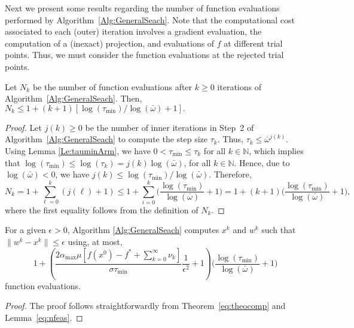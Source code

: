 Next we present some results regarding the  number of function evaluations performed by Algorithm~\ref{Alg:GeneralSeach}.
Note that the computational cost associated to each (outer) iteration involves a gradient evaluation, the computation of a (inexact) projection, and evaluations of $f$ at different trial points.
Thus, we must consider the function evaluations at the rejected trial points.
\begin{lemma} \label{eq:nfeas}
	Let $N_{k}$ be  the number of function evaluations after $k\geq 0$ iterations of Algorithm~\textup{\ref{Alg:GeneralSeach}}. Then,  $N_{k}\leq 1+ (k+1)[\log (\tau_{\min})/\log (\bar\omega)+1].$
\end{lemma}
\begin{proof}
	Let $j(k)\geq 0$ be the number of inner iterations in Step~2 of Algorithm~\ref{Alg:GeneralSeach} to compute the step size $\tau_k$.  Thus, $\tau_k\leq {\bar\omega}^{j(k)}$.
	Using Lemma \ref {Le:tauminArm}, we have  $0< \tau_{\min}\leq  \tau _{k}$ for all  $k\in \mathbb{N}$, which implies that  $ \log \left( \tau_{\min} \right) \leq \log (\tau _{k})=j(k) \log (\bar\omega)$, for all $k \in \mathbb{N}$.  Hence, due to  $\log(\bar\omega) <0$, we have $ j(k) \leq \log (\tau_{\min})/\log (\bar\omega)$. Therefore,
	$$
		N_k =	1+ \sum _{\ell=0}^{k}(j(\ell)+1)\leq 1+  \sum _{i=0}^{k} \Big(\frac{\log (\tau_{\min})}{\log (\bar\omega)} +1\Big)= 1+(k+1) \Big(\frac{\log (\tau_{\min})}{\log (\bar\omega)}+1\Big),
	$$
	where the first equality follows from the definition of $N_k$.
\end{proof}
\begin{theorem}
	For a given $\epsilon>0$, Algorithm \ref{Alg:GeneralSeach} computes $x^k$ and $w^k$ such that $\|  w^{k}-x^{k}\|\leq \epsilon$ using,  at most,
	$$1+\left({\frac{2{\alpha_{\max}}\mu\left[f(x^0)-f^* +\sum_{k= 0}^{\infty}\nu_k\right] }{\sigma \tau_{\min}}} \frac{1}{\epsilon^2}+1\right) \Big(\frac{\log (\tau_{\min})}{\log (\bar\omega)}+1\Big)$$
	function evaluations.

\end{theorem}
\begin{proof}
	The proof follows straightforwardly from Theorem~\ref{eq:theocomp} and Lemma~\ref{eq:nfeas}.
\end{proof}

